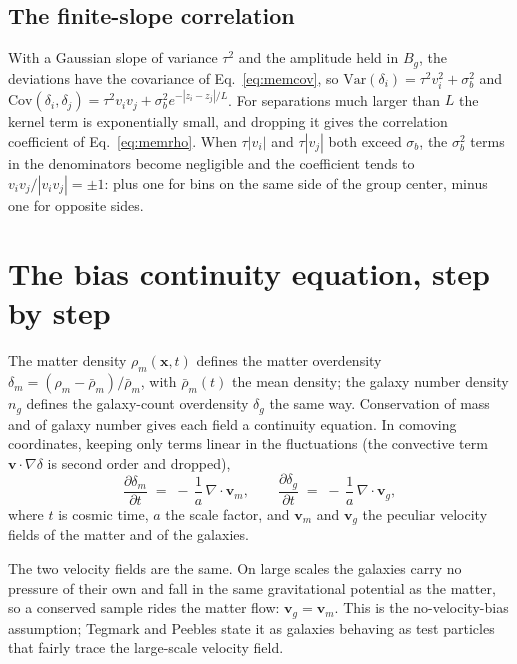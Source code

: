 \documentclass[11pt]{article}
\begin{document}
\subsection{The finite-slope correlation}

With a Gaussian slope of variance $\tau^2$ and the amplitude held in
$B_g$, the deviations have the covariance of Eq.~\eqref{eq:memcov},
so $\mathrm{Var}(\delta_i) = \tau^2 v_i^2 + \sigma_b^2$ and
$\mathrm{Cov}(\delta_i, \delta_j) = \tau^2 v_i v_j +
\sigma_b^2 e^{-|z_i - z_j|/L}$.  For separations much larger than
$L$ the kernel term is exponentially small, and dropping it gives
the correlation coefficient of Eq.~\eqref{eq:memrho}.  When
$\tau |v_i|$ and $\tau |v_j|$ both exceed $\sigma_b$, the
$\sigma_b^2$ terms in the denominators become negligible and the
coefficient tends to $v_i v_j / |v_i v_j| = \pm 1$: plus one for
bins on the same side of the group center, minus one for opposite
sides.

\section{The bias continuity equation, step by step}
\label{app:continuity}

The matter density $\rho_m(\mathbf{x}, t)$ defines the matter
overdensity $\delta_m = (\rho_m - \bar\rho_m)/\bar\rho_m$, with
$\bar\rho_m(t)$ the mean density; the galaxy number density $n_g$
defines the galaxy-count overdensity $\delta_g$ the same way.
Conservation of mass and of galaxy number gives each field a
continuity equation.  In comoving coordinates, keeping only terms
linear in the fluctuations (the convective term
$\mathbf{v} \cdot \nabla \delta$ is second order and dropped),
\begin{equation}
  \frac{\partial \delta_m}{\partial t}
  \;=\;
  -\,\frac{1}{a}\,\nabla \cdot \mathbf{v}_m,
  \qquad
  \frac{\partial \delta_g}{\partial t}
  \;=\;
  -\,\frac{1}{a}\,\nabla \cdot \mathbf{v}_g,
  \label{eq:continuity}
\end{equation}
where $t$ is cosmic time, $a$ the scale factor, and $\mathbf{v}_m$
and $\mathbf{v}_g$ the peculiar velocity fields of the matter and of
the galaxies.

The two velocity fields are the same.  On large scales the galaxies
carry no pressure of their own and fall in the same gravitational
potential as the matter, so a conserved sample rides the matter flow:
$\mathbf{v}_g = \mathbf{v}_m$.  This is the no-velocity-bias
assumption; Tegmark and Peebles \cite{TegmarkPeebles1998} state it as
galaxies behaving as test particles that fairly trace the large-scale
velocity field.
\end{document}
